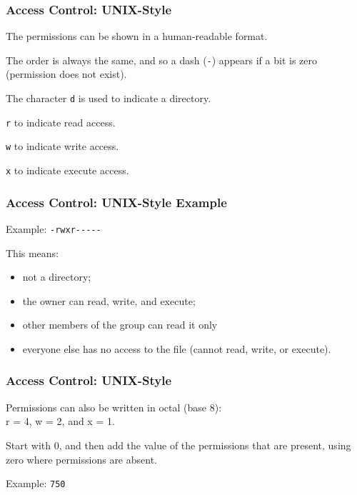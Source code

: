 \begin{frame}
\frametitle{Access Control: UNIX-Style}
\begin{changemargin}{1cm}

The permissions can be shown in a human-readable format.

The order is always the same, and so a dash (\texttt{-}) appears if a bit is zero (permission does not exist). 

The character \texttt{d} is used to indicate a directory.

\texttt{r} to indicate read access.

\texttt{w} to indicate write access.

\texttt{x} to indicate execute access.


\end{changemargin}
\end{frame}

\begin{frame}
\frametitle{Access Control: UNIX-Style Example}
\begin{changemargin}{1cm}

Example: \texttt{-rwxr{-}{-}{-}{-}{-}} 

This means:
\begin{itemize}
\item not a directory; 
\item the owner can read, write, and execute; 
\item other members of the group can read it only
\item everyone else has no access to the file (cannot read, write, or execute).
\end{itemize}

\end{changemargin}
\end{frame}

\begin{frame}
\frametitle{Access Control: UNIX-Style}
\begin{changemargin}{1cm}

Permissions can also be written in octal (base 8): \\
\quad r = 4, w = 2, and x = 1. 

Start with 0, and then add the value of the  permissions that are present, using zero where permissions are absent. 

Example: \texttt{750} 

\end{changemargin}
\end{frame}

